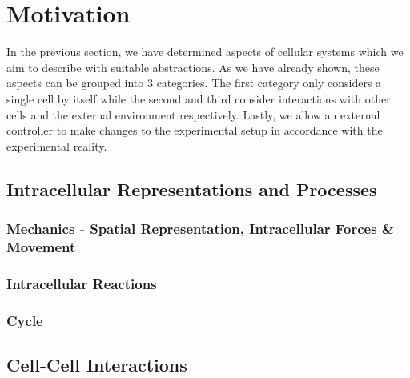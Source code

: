 \documentclass{article}
\begin{document}
\newpage
\pagebreak

\section{Motivation}
\label{subsec:motivation}
In the previous section, we have determined aspects of cellular systems which we aim to describe
with suitable abstractions.
As we have already shown, these aspects can be grouped into 3 categories.
The first category only considers a single cell by itself while the second and third consider
interactions with other cells and the external environment respectively.
Lastly, we allow an external controller to make changes to the experimental setup in accordance with
the experimental reality.

\subsection{Intracellular Representations and Processes}
\label{subsec:abstractions-cell}
\subsubsection{Mechanics - Spatial Representation, Intracellular Forces \& Movement}
\label{subsubsec:abstractions-cell-mechanics}
\subsubsection{Intracellular Reactions}
\label{subsubsec:abstractions-cell-reactions}
\subsubsection{Cycle}
\label{subsubsec:abstractions-cell-cycle}

\subsection{Cell-Cell Interactions}
\label{subsec:abstractions-cell-cell}
\end{document}
